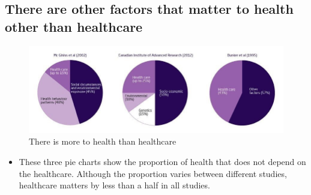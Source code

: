         \subsection{There are other factors that matter to health other than healthcare} 
        \begin{figure}[H]%
                \centering
                \includegraphics[width=5in]{images/ch3/14.png}
                \caption{There is more to health than healthcare}
                \label{fig:label}
            \end{figure} 
\begin{itemize}           
        \item  These three pie charts show the proportion of health that does not depend on the healthcare. Although the proportion varies between different studies, healthcare matters by less than a half in all studies.
        \end{itemize}


